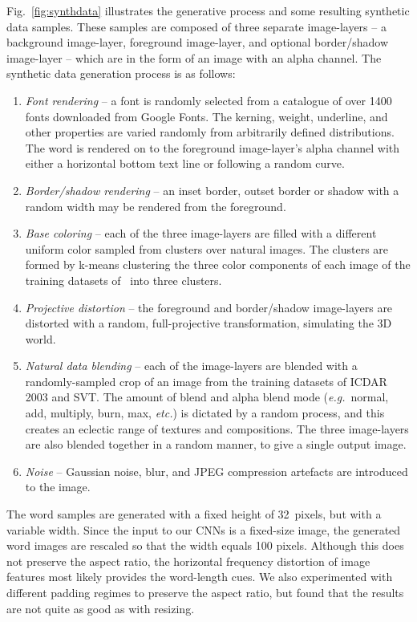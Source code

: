 \documentclass{article} \usepackage{nips14submit_e,times}
\newcommand{\figref}[1]{Fig.~\ref{#1}}
\def\eg{\emph{e.g.}}
\begin{document}
\figref{fig:synthdata} illustrates the generative process and some resulting synthetic data samples. These samples are composed of three separate image-layers -- a background image-layer, foreground image-layer, and optional border/shadow image-layer -- which are in the form of an image with an alpha channel. The synthetic data generation process is as follows:
\begin{enumerate}
  \item {\emph{Font rendering} -- a font is randomly selected from a catalogue of over 1400 fonts downloaded from Google Fonts. The kerning, weight, underline, and other properties are varied randomly from arbitrarily defined distributions. The word is rendered on to the foreground image-layer's alpha channel with either a horizontal bottom text line or following a random curve.}
  \item \emph{Border/shadow rendering} -- an inset border, outset border or shadow with a random width may be rendered from the foreground.

\item \emph{Base coloring} -- each of the three image-layers are 
filled with a different uniform color sampled
from clusters over natural images. The clusters are formed by
k-means clustering the three color components of each image of the
training datasets of~\cite{ICDAR03} into three clusters.

  \item \emph{Projective distortion} -- the foreground and border/shadow image-layers are distorted with a random, full-projective transformation, simulating the 3D world.
  \item \emph{Natural data blending} -- each of the image-layers are blended with a randomly-sampled crop of an image from the training datasets of ICDAR 2003 and SVT. The amount of blend and alpha blend mode (\eg~normal, add, multiply, burn, max, \emph{etc.}) is dictated by a random process, and this creates an eclectic range of textures and compositions. The three image-layers are also blended together in a random manner, to give a single output image.
  \item \emph{Noise} -- Gaussian noise, blur, and JPEG compression artefacts are introduced to the image.
\end{enumerate}

The word samples are generated with a fixed height of 32~pixels, but with a variable width. Since the input to our CNNs is a fixed-size image, the generated word images are rescaled so that the width equals 100 pixels.
Although this does not preserve the aspect ratio, the horizontal frequency distortion of image features most likely provides the word-length cues. We also experimented with different padding regimes to preserve the aspect ratio, but found that the results are not quite as good as with resizing. 
\end{document}
